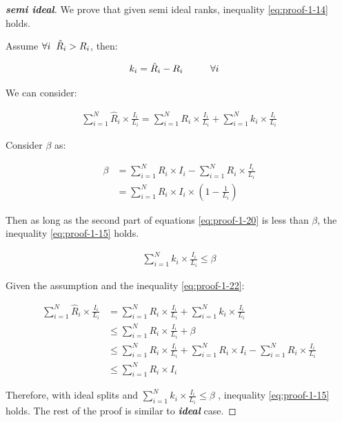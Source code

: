 \documentclass{article}
\begin{document}
\begin{proof}[\textbf{semi ideal}] 
	We prove that given semi ideal ranks, inequality \ref{eq:proof-1-14} holds. 
	
	Assume $\forall i \hspace{2mm}\hat{R}_i > R_i$, then:
	
	\begin{align}
		\label{eq:proof-1-19}
		k_i = \hat{R}_i - R_i \hspace{10mm}&  \forall i
	\end{align}

	We can consider:
	
	\begin{align}
		\label{eq:proof-1-20}
		\sum_{i=1}^{N} \hat{R}_i \times \frac{I_i}{L_i} = \sum_{i=1}^{N} R_i \times \frac{I_i}{L_i} + \sum_{i=1}^{N} k_i \times \frac{I_i}{L_i}
	\end{align}

	Consider $\beta$ as:
	
	\begin{align}
		\label{eq:proof-1-21}
		\beta &= \sum_{i=1}^{N} R_i \times I_i - \sum_{i=1}^{N} R_i \times \frac{I_i}{L_i}
		\nonumber\\
		&= \sum_{i=1}^{N} R_i \times I_i \times (1 - \frac{1}{L_i})
	\end{align}

	Then as long as the second part of equations \ref{eq:proof-1-20} is less than $\beta$, the inequality \ref{eq:proof-1-15} holds.
	
	\begin{align}
		\label{eq:proof-1-22}
		\sum_{i=1}^{N} k_i \times \frac{I_i}{L_i} \leq \beta
	\end{align}

Given the assumption and the inequality \ref{eq:proof-1-22}:

\begin{align}
	\label{eq:proof-1-23}
	\sum_{i=1}^{N} \hat{R}_i \times \frac{I_i}{L_i} &= \sum_{i=1}^{N} R_i \times \frac{I_i}{L_i} + \sum_{i=1}^{N} k_i \times \frac{I_i}{L_i}
	\nonumber \\
	&\leq \sum_{i=1}^{N} R_i \times \frac{I_i}{L_i} + \beta 
	\nonumber\\
	&\leq  \sum_{i=1}^{N} R_i \times \frac{I_i}{L_i} + \sum_{i=1}^{N} R_i \times I_i - \sum_{i=1}^{N} R_i \times \frac{I_i}{L_i}
	\nonumber\\
	&\leq  \sum_{i=1}^{N} R_i \times I_i
\end{align}

Therefore, with ideal splits and $\sum_{i=1}^{N} k_i \times \frac{I_i}{L_i} \leq \beta$ , inequality \ref{eq:proof-1-15} holds. The rest of the proof is similar to \textit{\textbf{ideal}} case.
\end{proof} 
\end{document}

